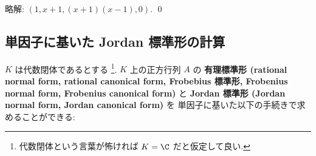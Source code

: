 \documentclass[12pt,twoside]{jarticle}
\newcommand\commentout[1]{#1}
\newcommand\commentout[1]{}
\begin{document}
\commentout{
\noindent
略解: $(1,x+1,(x+1)(x-1),0)$. 
\qed
}


\subsection{単因子に基いた Jordan 標準形の計算}
\label{sec:calc-ed-Jordan}

$K$ は代数閉体であるとする%
\footnote{代数閉体という言葉が怖ければ $K=\C$ だと仮定して良い.}.
$K$ 上の正方行列 $A$ の
{\bf 有理標準形 (rational normal form, rational canonical form, 
Frobebius 標準形, Frobenius normal form, Frobenius canonical form)} 
と {\bf Jordan 標準形 (Jordan normal form, Jordan canonical form)} を
単因子に基いた以下の手続きで求めることができる:
\end{document}
